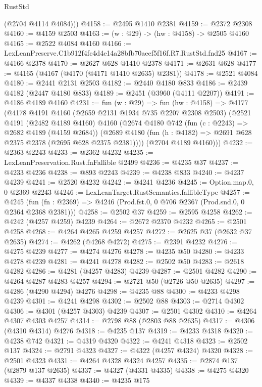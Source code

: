 \begin{lexlean}{RustStd}
\begin{coremodule}
        (@2704 @4114 @4084)))
@4158 := @2495 @1410 @2381
@4159 := @2372 @2308
@4160 := @4159 @2503
@4163 := (w : @29) -> (hw : @4158) -> @2505 @4160
@4165 := @2522 @4084 @4160
@4166 := LexLeanPreserve.C1b912f4fc4d4e14a28bfb70aeef5f16f.R7.RustStd.fnd25
@4167 := @4166 @2378
@4170 := @2627 @628 @1410 @2378
@4171 := @2631 @628
@4177 := @4165 (@4167 (@4170 (@4171 @1410 @2635) @2381))
@4178 := @2521 @4084
@4180 := @2441 @2131 @2503
@4182 := @2440 @4180 @833
@4186 := @2439 @4182 (@2447 @4180 @833)
@4189 := @2451 (@3960 (@4111 @2207))
@4191 := @4186 @4189 @4160
@4231 := fun (w : @29) =>
  fun (hw : @4158) =>
  @4177
    (@4178
      @4191
      @4160
      (@2659 @2131 @1934 @735 @2207 @2308 @2503)
      (@2521
        @4191
        (@2482 @4189 @4160)
        @4160
        (@2674
          @4180
          @742
          (fun (c : @2243) => @2682 @4189 (@4159 @2684))
          (@2689 @4180 (fun (h : @4182) => @2691 @628 @2375 @2378 (@2695 @628 @2375 @2381))))
        (@2704 @4189 @4160)))
@4232 := @2363 @2243
@4233 := @2362 @4232
@4235 := LexLeanPreservation.Rust.fnFallible @2499
@4236 := @4235 @37
@4237 := @4233 @4236
@4238 := @893 @2243
@4239 := @4238 @833
@4240 := @4237 @4239
@4241 := @2520 @4232
@4242 := @4241 @4236
@4245 := Option.map.{0, 0} @2369 @2243
@4246 := LexLeanTarget.RustSemantics.fallibleType
@4257 := @4245
    (fun (fn : @2369) => @4246 (Prod.fst.{0, 0} @706 @2367 (Prod.snd.{0, 0} @2364 @2368 @2381)))
@4258 := @2502 @37
@4259 := @2595 @4258
@4262 := @4242 (@4257 @4259) @4239
@4264 := @2672 @2370 @4232
@4265 := @2501 @4258
@4268 := @4264 @4265 @4259 @4257
@4272 := @2625 @37 (@2632 @37 @2635)
@4274 := @4262 (@4268 @4272)
@4275 := @2391 @4232
@4276 := @4275 @4239
@4277 := @4274 @4276
@4278 := @4235 @50
@4280 := @4233 @4278 @4239
@4281 := @4241 @4278
@4282 := @2502 @50
@4283 := @2618 @4282
@4286 := @4281 (@4257 @4283) @4239
@4287 := @2501 @4282
@4290 := @4264 @4287 @4283 @4257
@4294 := @2721 @50 (@2726 @50 @2635)
@4297 := @4286 (@4290 @4294) @4276
@4298 := @4235 @88
@4300 := @4233 @4298 @4239
@4301 := @4241 @4298
@4302 := @2502 @88
@4303 := @2714 @4302
@4306 := @4301 (@4257 @4303) @4239
@4307 := @2501 @4302
@4310 := @4264 @4307 @4303 @4257
@4314 := @2798 @88 (@2803 @88 @2635)
@4317 := @4306 (@4310 @4314) @4276
@4318 := @4235 @137
@4319 := @4233 @4318
@4320 := @4238 @742
@4321 := @4319 @4320
@4322 := @4241 @4318
@4323 := @2502 @137
@4324 := @2791 @4323
@4327 := @4322 (@4257 @4324) @4320
@4328 := @2501 @4323
@4331 := @4264 @4328 @4324 @4257
@4335 := @2874 @137 (@2879 @137 @2635)
@4337 := @4327 (@4331 @4335)
@4338 := @4275 @4320
@4339 := @4337 @4338
@4340 := @4235 @175

\end{coremodule}
\end{lexlean}
